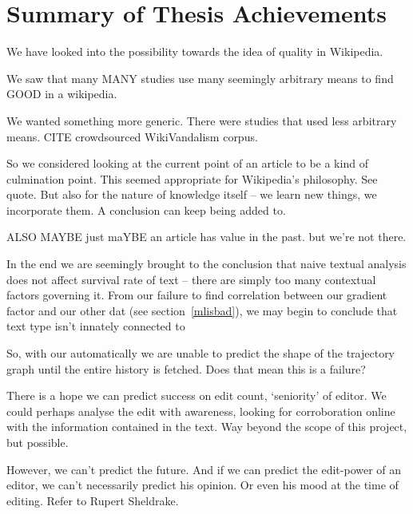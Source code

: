 \section{Summary of Thesis Achievements}
We have looked into the possibility towards the idea of quality in
Wikipedia. 

We saw that many MANY studies use many seemingly arbitrary means to
find GOOD in a wikipedia.

We wanted something more generic. There were studies that used less
arbitrary means. CITE crowdsourced WikiVandalism corpus. 

So we considered looking at the current point of an article to be a
kind of culmination point. This seemed appropriate for Wikipedia's
philosophy. See quote. But also for the nature of knowledge itself --
we learn new things, we incorporate them. A conclusion can keep being
added to.

ALSO MAYBE just maYBE an article has value in the past. but we're not
there.

In the end we are seemingly brought to the conclusion that naive
textual analysis does not affect survival rate of text -- there are
simply too many contextual factors governing it. From our failure to
find correlation between our gradient factor and our other dat (see
section~\ref{mlisbad}), we may begin to conclude that text type isn't
innately connected to 

So, with our automatically we are unable to predict the shape of the
trajectory graph until the entire history is fetched. Does that mean
this is a failure? 

There is a hope we can predict success on edit count, `seniority' of
editor. We could perhaps analyse the edit with awareness, looking for
corroboration online with the information contained in the
text. Way beyond the scope of this project, but possible.

However, we can't predict the future. And if we can predict the
edit-power of an editor, we can't necessarily predict his opinion. Or
even his mood at the time of editing. Refer to Rupert Sheldrake.
